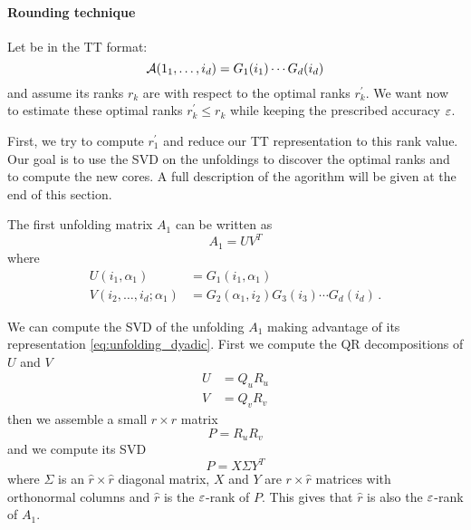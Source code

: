 \paragraph{Rounding technique}
Let \A be in the TT format:
\begin{equation*}
  \mathcal{A}(1_1,\ldots,i_d) = G_1(i_1) \cdots G_d(i_d)
\end{equation*}
and assume its ranks $r_k$ are  with respect to the optimal ranks $r_k^\prime$. We want now to estimate these optimal ranks $r_k^\prime \le r_k$ while keeping the prescribed accuracy $\varepsilon$.

First, we try to compute $r_1^\prime$ and reduce our TT representation to this rank value. Our goal is to use the SVD on the unfoldings to discover the optimal ranks and to compute the new  cores. A full description of the agorithm will be given at the end of this section.

The first unfolding matrix $A_1$ can be written as
\begin{equation} \label{eq:unfolding_dyadic}
  A_1 = UV^T
\end{equation}
where
\begin{equation} \label{def:UV}
  \begin{split}
    U(i_1,\alpha_1) &= G_1(i_1,\alpha_1)\\
    V(i_2,\ldots,i_d;\alpha_1) &= G_2(\alpha_1,i_2) G_3(i_3) \cdots G_d(i_d)\, .
  \end{split}
\end{equation}

We can compute the SVD of the unfolding $A_1$ making advantage of its representation \eqref{eq:unfolding_dyadic}. First we compute the QR decompositions of $U$ and $V$
\begin{equation*}
  \begin{split}
    U &= Q_u R_u\\
    V &= Q_v R_v
  \end{split}
\end{equation*}
then we assemble a small $r \times r$ matrix
\begin{equation*}
  P = R_u R_v
\end{equation*}
and we compute its SVD
\begin{equation*}
  P = X \Sigma Y^T
\end{equation*}
where $\Sigma$ is an $\hat{r}\times\hat{r}$ diagonal matrix, $X$ and $Y$ are $r \times \hat{r}$ matrices with orthonormal columns and $\hat{r}$ is the $\varepsilon$-rank of $P$. This gives that $\hat{r}$ is also the $\varepsilon$-rank of $A_1$.

